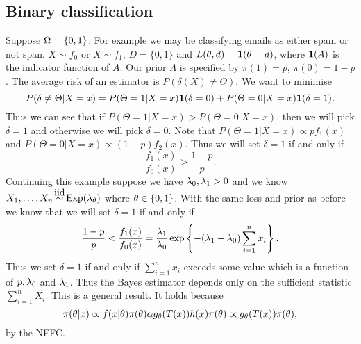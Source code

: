 \subsection{Binary classification}
Suppose ${{\Omega}} = \{0,1\}$. For example we may be classifying emails as either spam or not span. $X \sim f_0$ or $X\sim f_1$, $D = \{0,1\}$ and $L({\theta},d) = {{\bf 1}}({\theta} = d)$, where ${{\bf 1}}(A)$ is the indicator function of $A$. Our prior $\Lambda$ is specified by $\pi(1) = p$, $\pi(0) = 1-p$. The average risk of an estimator is $P(\delta(X) \neq \Theta)$. We want to minimise
\[P(\delta \neq \Theta | X=x) = P(\Theta = 1|X=x){{\bf 1}}(\delta = 0)+P(\Theta = 0|X=x){{\bf 1}}(\delta=1). \]
Thus we can see that if $P(\Theta = 1|X=x) > P(\Theta = 0|X=x)$, then we will pick $\delta=1$ and otherwise we will pick $\delta = 0$. Note that $P(\Theta = 1|X=x) \propto pf_1(x)$ and $P(\Theta = 0|X=x) \propto (1-p)f_2(x)$. Thus we will set $\delta = 1$ if and only if 
\[\frac{f_1(x)}{f_0(x)} > \frac{1-p}{p}. \]
Continuing this example suppose we have $\lambda_0, \lambda_1 > 0$ and we know $X_1,\ldots,X_n \iid \text{Exp}(\la_\ta)$ where ${\theta} \in \{0,1\}$. With the same loss and prior as before we know that we will set $\delta = 1$ if and only if
\[\frac{1-p}{p} < \frac{f_1(x)}{f_0(x)} = \frac{\lambda_1}{\lambda_0}\exp\left\{-(\lambda_1-\lambda_0)\sum_{i=1}^n x_i\right\}. \]
Thus we set $\delta = 1$ if and only if $\sum_{i=1}^n x_i$ exceeds some value which is a function of $p,\lambda_0$ and $\lambda_1$. Thus the Bayes estimator depends only on the sufficient statistic $\sum_{i=1}^n X_i$. This is a general result. It holds because
\[\pi({\theta} | x) \propto f(x|{\theta})\pi({\theta}) {\alpha} g_{\theta}(T(x))h(x)\pi({\theta}) \propto g_{\theta}(T(x))\pi({\theta}), \]
by the NFFC. 
